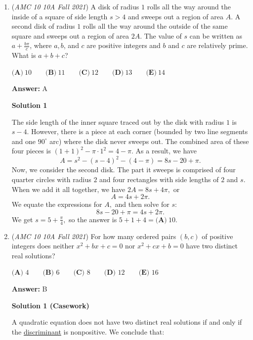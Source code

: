\begin{enumerate}
 There cannot be any more cases above $2$ restrictions since $C, W$ and $S, P$ constitute the whole grid, and if we already have $C, W$ and try to add another $C$ or $W$, we quickly see this is not allowed. Summing over the cases, we get $60 + 16 + 8 = 84$.

 


	\item (\textit{AMC 10 10A Fall 2021}) A disk of radius $1$ rolls all the way around the inside of a square of side length $s>4$ and sweeps out a region of area $A$. A second disk of radius $1$ rolls all the way around the outside of the same square and sweeps out a region of area $2A$. The value of $s$ can be written as $a+\frac{b\pi}{c}$, where $a,b$, and $c$ are positive integers and $b$ and $c$ are relatively prime. What is $a+b+c$?


 $\textbf{(A)} ~10\qquad\textbf{(B)} ~11\qquad\textbf{(C)} ~12\qquad\textbf{(D)} ~13\qquad\textbf{(E)} ~14$

 \textbf{Answer: }A



\textbf{Solution 1}

The side length of the inner square traced out by the disk with radius $1$ is $s-4.$ However, there is a piece at each corner (bounded by two line segments and one $90^\circ$ arc) where the disk never sweeps out. The combined area of these four pieces is $(1+1)^2-\pi\cdot1^2=4-\pi.$ As a result, we have 
 \[A=s^2-(s-4)^2-(4-\pi)=8s-20+\pi.\]Now, we consider the second disk. The part it sweeps is comprised of four quarter circles with radius $2$ and four rectangles with side lengths of $2$ and $s.$ When we add it all together, we have $2A=8s+4\pi,$ or 
 \[A=4s+2\pi.\]We equate the expressions for $A,$ and then solve for $s:$ 
 \[8s-20+\pi=4s+2\pi.\]We get $s=5+\frac{\pi}{4},$ so the answer is $5+1+4=\boxed{\textbf{(A)} ~10}.$



	\item (\textit{AMC 10 10A Fall 2021}) For how many ordered pairs $(b,c)$ of positive integers does neither $x^2+bx+c=0$ nor $x^2+cx+b=0$ have two distinct real solutions?


 $\textbf{(A) } 4 \qquad \textbf{(B) } 6 \qquad \textbf{(C) } 8 \qquad \textbf{(D) } 12 \qquad \textbf{(E) } 16 \qquad$

 \textbf{Answer: }B



\textbf{Solution 1 (Casework)}

A quadratic equation does not have two distinct real solutions if and only if the \href{https://artofproblemsolving.com/wiki/index.php?title=Discriminant}{discriminant} is nonpositive. We conclude that:


\end{enumerate}
